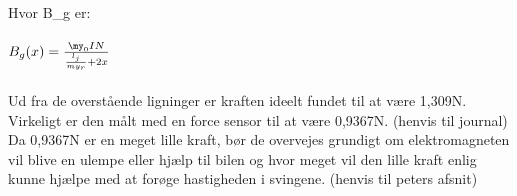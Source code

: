 Hvor B_{g} er:
\\
\\
$ B_{g}(x)=\frac{\my_{0}IN}{{\frac{l_{j}}{my_{r}}}+2x} $
\\
\\
Ud fra de overstående ligninger er kraften ideelt fundet til at være 1,309N. Virkeligt er den målt med en force sensor til at være 0,9367N. (henvis til journal) \\
Da 0,9367N er en meget lille kraft, bør de overvejes grundigt om elektromagneten vil blive en ulempe eller hjælp til bilen og hvor meget vil den lille kraft enlig kunne hjælpe med at forøge hastigheden i svingene. (henvis til peters afsnit)\\

